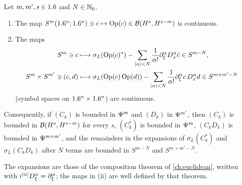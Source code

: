 \begin{lemma}\label{microlocal:lem:continuity}
  Let $m,m',s\in1.6$ and $N\in\mathbb{N}_0$.
  \begin{enumerate}[label=\textup{(\roman*)}]
  \item The map $S^m(1.6^n;1.6^n)\ni c\mapsto\operatorname{Op}(c)\in\mathcal{B}(H^s,H^{s-m})$ is
    continuous.
  \item The maps
    \begin{align*}
      S^m\ni c&\longmapsto\sigma_L(\operatorname{Op}(c)^*)-\sum_{\lvert \alpha\rvert<N}\frac1{\alpha!}
      \partial^\alpha_\xi D^\alpha_x\bar c\in S^{m-N},\\
      S^m\times S^{m'}\ni(c,d)&\longmapsto\sigma_L(\operatorname{Op}(c)\operatorname{Op}(d))-
      \sum_{\lvert \alpha\rvert<N}\frac1{\alpha!}\partial^\alpha_\xi c\,D^\alpha_xd\in S^{m+m'-N}
    \end{align*}
    (symbol spaces on $1.6^n\times1.6^n$) are continuous.
  \end{enumerate}
  Consequently, if $(C_k)$ is bounded in $\Psi^{m}$ and $(D_k)$ in $\Psi^{m'}$,
  then $(C_k)$ is bounded in $\mathcal{B}(H^s,H^{s-m})$ for every $s$, $(C_k^*)$ is
  bounded in $\Psi^{m}$, $(C_kD_k)$ is bounded in $\Psi^{m+m'}$, and the
  remainders in the expansions of $\sigma_L(C_k^*)$ and $\sigma_L(C_kD_k)$ after
  $N$ terms are bounded in $S^{m-N}$ and $S^{m+m'-N}$.
\end{lemma}

The expansions are those of the composition theorem of \cref{ch:euclidean},
written with $i^{\lvert \alpha\rvert}D^\alpha_\xi=\partial^\alpha_\xi$; the maps in (ii) are well
defined by that theorem.

